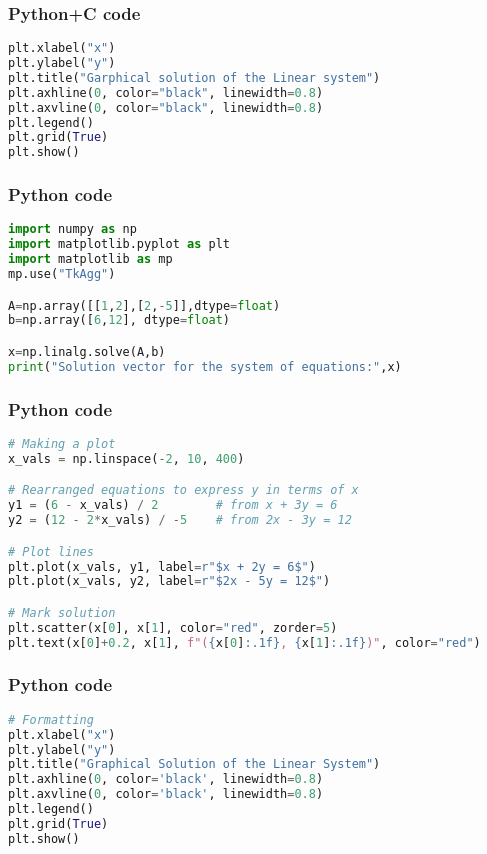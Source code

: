 \documentclass{beamer}
\begin{document}
\begin{frame}[fragile]
    \frametitle{Python+C code}

    \begin{lstlisting}[language=Python]
plt.xlabel("x")
plt.ylabel("y")
plt.title("Garphical solution of the Linear system")
plt.axhline(0, color="black", linewidth=0.8)
plt.axvline(0, color="black", linewidth=0.8)
plt.legend()
plt.grid(True)
plt.show()
    \end{lstlisting}
\end{frame}

\begin{frame}[fragile]
    \frametitle{Python code}
    \begin{lstlisting}[language=Python]
import numpy as np
import matplotlib.pyplot as plt
import matplotlib as mp
mp.use("TkAgg")

A=np.array([[1,2],[2,-5]],dtype=float)
b=np.array([6,12], dtype=float)

x=np.linalg.solve(A,b)
print("Solution vector for the system of equations:",x)
    \end{lstlisting}   
\end{frame}

\begin{frame}[fragile]
    \frametitle{Python code}
    \begin{lstlisting}[language=Python]
# Making a plot
x_vals = np.linspace(-2, 10, 400)

# Rearranged equations to express y in terms of x
y1 = (6 - x_vals) / 2        # from x + 3y = 6
y2 = (12 - 2*x_vals) / -5    # from 2x - 3y = 12

# Plot lines
plt.plot(x_vals, y1, label=r"$x + 2y = 6$")
plt.plot(x_vals, y2, label=r"$2x - 5y = 12$")

# Mark solution
plt.scatter(x[0], x[1], color="red", zorder=5)
plt.text(x[0]+0.2, x[1], f"({x[0]:.1f}, {x[1]:.1f})", color="red")
    \end{lstlisting}
    
\end{frame}

\begin{frame}[fragile]
    \frametitle{Python code}
    \begin{lstlisting}[language=Python]
# Formatting
plt.xlabel("x")
plt.ylabel("y")
plt.title("Graphical Solution of the Linear System")
plt.axhline(0, color='black', linewidth=0.8)
plt.axvline(0, color='black', linewidth=0.8)
plt.legend()
plt.grid(True)
plt.show()
    \end{lstlisting}  
\end{frame}
\end{document}
